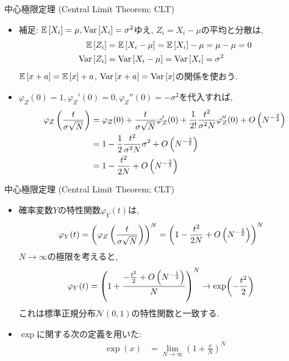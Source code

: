 \documentclass[dvipdfmx,notheorems,t]{beamer}
\begin{document}
\begin{frame}{中心極限定理 (Central Limit Theorem; CLT)}
\begin{itemize}
  \item 補足: $\operatorname{\mathbb{E}} \left[ X_i \right] = \mu, \operatorname{Var} \left[ X_i \right] = \sigma^2$ゆえ, $Z_i = X_i - \mu$の平均と分散は,
  \begin{align*}
    \operatorname{\mathbb{E}} \left[ Z_i \right] &= \operatorname{\mathbb{E}} \left[ X_i - \mu \right] = \operatorname{\mathbb{E}} \left[ X_i \right] - \mu = \mu - \mu = 0 \\
    \operatorname{Var} \left[ Z_i \right] &= \operatorname{Var} \left[ X_i - \mu \right] = \operatorname{Var} \left[ X_i \right] = \sigma^2
  \end{align*}
  $\operatorname{\mathbb{E}} \left[ x + a \right] = \operatorname{\mathbb{E}} \left[ x \right] + a$, $\operatorname{Var} \left[ x + a \right] = \operatorname{Var} \left[ x \right]$の関係を使おう.

  \item $\varphi_Z(0) = 1, \varphi_Z'(0) = 0, \varphi_Z''(0) = -\sigma^2$を代入すれば,
  \begin{align*}
    \varphi_Z \left( \frac{t}{\sigma \sqrt{N}} \right)
      &= \varphi_Z(0) + \frac{t}{\sigma \sqrt{N}} \varphi_Z'(0)
        + \frac{1}{2!} \frac{t^2}{\sigma^2 N} \varphi_Z''(0) + O \left( N^{-\frac{3}{2}} \right) \\
      &= 1 - \frac{1}{2} \frac{t^2}{\sigma^2 N} \sigma^2 + O \left( N^{-\frac{3}{2}} \right) \\
      &= 1 - \frac{t^2}{2N} + O \left( N^{-\frac{3}{2}} \right)
  \end{align*}
\end{itemize}
\end{frame}

\begin{frame}{中心極限定理 (Central Limit Theorem; CLT)}
\begin{itemize}
  \item 確率変数$Y$の特性関数$\varphi_Y(t)$は,
  \begin{align*}
    \varphi_Y(t) &= \left( \varphi_Z \left( \frac{t}{\sigma \sqrt{N}} \right) \right)^N
    = \left( 1 - \frac{t^2}{2N} + O \left( N^{-\frac{3}{2}} \right) \right)^N
  \end{align*}
  $N \to \infty$の極限を考えると,
  \begin{align*}
    \varphi_Y(t) &= \left( 1 + \frac{-\frac{t^2}{2} + O \left( N^{-\frac{1}{2}} \right)}{N} \right)^N
    \to \exp(-\frac{t^2}{2})
  \end{align*}
  これは標準正規分布$\mathcal{N}(0, 1)$の特性関数と一致する.
  \item $\exp$に関する次の定義を用いた:
  \begin{align*}
    \exp(x) &= \lim_{N \to \infty} \left( 1 + \frac{x}{N} \right)^N
  \end{align*}
\end{itemize}
\end{frame}
\end{document}
